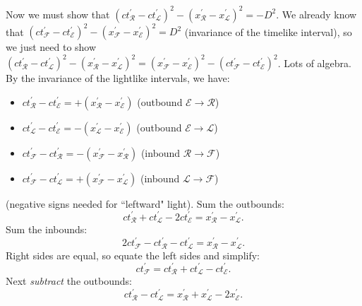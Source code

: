 \documentclass[12pt]{article}
\begin{document}
Now we must show that $(ct^{\prime}_{\mathcal{R}} - ct^{\prime}_{\mathcal{L}})^2 - (x^{\prime}_{\mathcal{R}} - x^{\prime}_{\mathcal{L}})^2 = - D^2$. We already know that $(ct^{\prime}_{\mathcal{F}} - ct^{\prime}_{\mathcal{E}})^2 - (x^{\prime}_{\mathcal{F}} - x^{\prime}_{\mathcal{E}})^2 = D^2$ (invariance of the timelike interval), so we just need to show $(ct^{\prime}_{\mathcal{R}} - ct^{\prime}_{\mathcal{L}})^2 - (x^{\prime}_{\mathcal{R}} - x^{\prime}_{\mathcal{L}})^2 = (x^{\prime}_{\mathcal{F}} - x^{\prime}_{\mathcal{E}})^2 - (ct^{\prime}_{\mathcal{F}} - ct^{\prime}_{\mathcal{E}})^2$. Lots of algebra. By the invariance of the lightlike intervals, we have:
\begin{itemize}
\item $ct^{\prime}_{\mathcal{R}} - ct^{\prime}_{\mathcal{E}} = + (x^{\prime}_{\mathcal{R}} - x^{\prime}_{\mathcal{E}})$ (outbound $\mathcal{E} \rightarrow \mathcal{R}$)
\item $ct^{\prime}_{\mathcal{L}} - ct^{\prime}_{\mathcal{E}} = - (x^{\prime}_{\mathcal{L}} - x^{\prime}_{\mathcal{E}})$ (outbound $\mathcal{E} \rightarrow \mathcal{L}$)
\item $ct^{\prime}_{\mathcal{F}} - ct^{\prime}_{\mathcal{R}} = - (x^{\prime}_{\mathcal{F}} - x^{\prime}_{\mathcal{R}})$ (inbound $\mathcal{R} \rightarrow \mathcal{F}$)
\item $ct^{\prime}_{\mathcal{F}} - ct^{\prime}_{\mathcal{L}} = + (x^{\prime}_{\mathcal{F}} - x^{\prime}_{\mathcal{L}})$ (inbound $\mathcal{L} \rightarrow \mathcal{F}$)
\end{itemize}
(negative signs needed for ``leftward" light). Sum the outbounds:
\begin{equation*}
ct^{\prime}_{\mathcal{R}} + ct^{\prime}_{\mathcal{L}} - 2 ct^{\prime}_{\mathcal{E}} = x^{\prime}_{\mathcal{R}} - x^{\prime}_{\mathcal{L}} .
\end{equation*}
Sum the inbounds:
\begin{equation*}
2 ct^{\prime}_{\mathcal{F}} - ct^{\prime}_{\mathcal{R}} - ct^{\prime}_{\mathcal{L}} = x^{\prime}_{\mathcal{R}} - x^{\prime}_{\mathcal{L}} .
\end{equation*}
Right sides are equal, so equate the left sides and simplify:
\begin{equation*}
ct^{\prime}_{\mathcal{F}} = ct^{\prime}_{\mathcal{R}} + ct^{\prime}_{\mathcal{L}} - ct^{\prime}_{\mathcal{E}} .
\end{equation*}
Next \emph{subtract} the outbounds:
\begin{equation*}
ct^{\prime}_{\mathcal{R}} - ct^{\prime}_{\mathcal{L}} = x^{\prime}_{\mathcal{R}} + x^{\prime}_{\mathcal{L}} - 2 x^{\prime}_{\mathcal{E}} .
\end{equation*}
\end{document}
